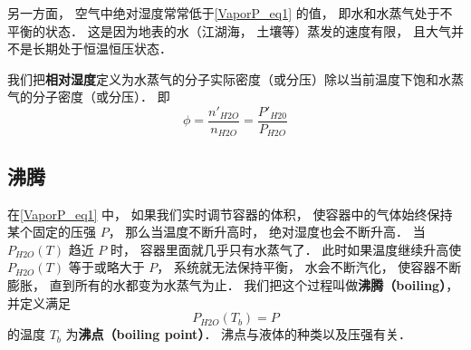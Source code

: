 另一方面， 空气中绝对湿度常常低于\autoref{VaporP_eq1} 的值， 即水和水蒸气处于不平衡的状态． 这是因为地表的水（江湖海， 土壤等）蒸发的速度有限， 且大气并不是长期处于恒温恒压状态．

我们把\textbf{相对湿度}定义为水蒸气的分子实际密度（或分压）除以当前温度下饱和水蒸气的分子密度（或分压）． 即
\begin{equation}
\phi = \frac{n'_{H2O}}{n_{H2O}} = \frac{P'_{H20}}{P_{H2O}}
\end{equation}

\subsection{沸腾}
在\autoref{VaporP_eq1} 中， 如果我们实时调节容器的体积， 使容器中的气体始终保持某个固定的压强 $P$， 那么当温度不断升高时， 绝对湿度也会不断升高． 当 $P_{H2O}(T)$ 趋近 $P$ 时， 容器里面就几乎只有水蒸气了． 此时如果温度继续升高使 $P_{H2O}(T)$ 等于或略大于 $P$， 系统就无法保持平衡， 水会不断汽化， 使容器不断膨胀， 直到所有的水都变为水蒸气为止． 我们把这个过程叫做\textbf{沸腾（boiling）}， 并定义满足
\begin{equation}
P_{H2O}(T_b) = P
\end{equation}
的温度 $T_b$ 为\textbf{沸点（boiling point）}． 沸点与液体的种类以及压强有关．
